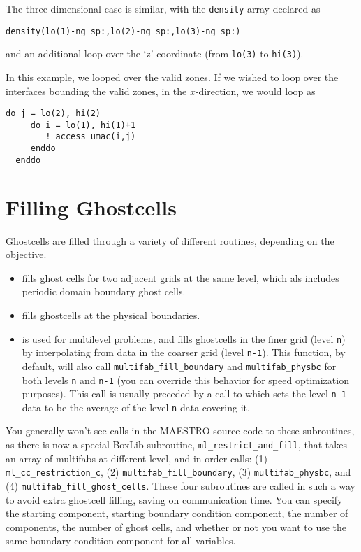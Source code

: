 The three-dimensional case is similar, with the {\tt density} array
declared as 
\begin{lstlisting}[language={[95]fortran},mathescape=false]
  density(lo(1)-ng_sp:,lo(2)-ng_sp:,lo(3)-ng_sp:)
\end{lstlisting}
and an additional loop over the `z' coordinate (from {\tt lo(3)} to
{\tt hi(3)}).

In this example, we looped over the valid zones.  If we wished to loop
over the interfaces bounding the valid zones, in the $x$-direction,
we would loop as
\begin{lstlisting}[language={[95]fortran},mathescape=false]
  do j = lo(2), hi(2)
     do i = lo(1), hi(1)+1
        ! access umac(i,j)
     enddo
  enddo
\end{lstlisting}


\section{Filling Ghostcells}

Ghostcells are filled through a variety of different routines, depending
on the objective.

\begin{itemize}

\item {} fills ghost cells for two
  adjacent grids at the same level, which als includes periodic domain
  boundary ghost cells.

\item {} fills ghostcells at the physical boundaries.

\item {} is used for multilevel
  problems, and fills ghostcells in the finer grid (level {\tt n}) by
  interpolating from data in the coarser grid (level {\tt n-1}).
  This function, by default, will also call {\tt multifab\_fill\_boundary}
  and {\tt multifab\_physbc} for both levels {\tt n} and {\tt n-1} (you 
  can override this behavior for speed optimization purposes).
  This call is usually preceded by a call to 
   which sets the level {\tt n-1} data to be
  the average of the level {\tt n} data covering it.
   
\end{itemize}

You generally won't see calls in the MAESTRO source code to these subroutines,
as there is now a special BoxLib subroutine, {\tt ml\_restrict\_and\_fill},
that takes an array of multifabs at different level, and in order calls:
(1) {\tt ml\_cc\_restriction\_c}, (2) {\tt multifab\_fill\_boundary},
(3) {\tt multifab\_physbc}, and (4) {\tt multifab\_fill\_ghost\_cells}.
These four subroutines are called in such a way to avoid extra
ghostcell filling, saving on communication time.  You can specify the
starting component, starting boundary condition component, 
the number of components, the number of ghost cells,
and whether or not you want to use the same boundary condition component
for all variables.

